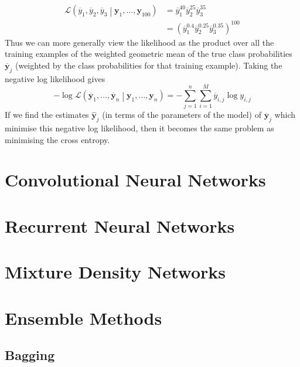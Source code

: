 \documentclass[11pt]{report} %
\begin{document}
\begin{align}
\mathcal{L}\left(\overline{y}_{1}, \overline{y}_{2}, \overline{y}_{3}\middle|\mathbf{y}_{1}, \dots, \mathbf{y}_{100}\right) &= \overline{y}_{1}^{40}\overline{y}_{2}^{25}\overline{y}_{3}^{35} \\
&= \left(\overline{y}_{1}^{0.4}\overline{y}_{2}^{0.25}\overline{y}_{3}^{0.35}\right)^{100}
\end{align}
Thus we can more generally view the likelihood as the product over all the training examples of the weighted geometric mean of the true class probabilities $\overline{\mathbf{y}}_{j}$ (weighted by the class probabilities for that training example). Taking the negative log likelihood gives
\begin{equation}
-\log\mathcal{L}\left(\overline{\mathbf{y}}_{1}, \dots, \overline{\mathbf{y}}_{n}\middle|\mathbf{y}_{1}, \dots, \mathbf{y}_{n}\right) = -\sum_{j = 1}^{n}\sum_{i = 1}^{M}\overline{y}_{i, j}\log{y_{i, j}}
\end{equation}
If we find the estimates $\hat{\mathbf{y}}_{j}$ (in terms of the parameters of the model) of $\overline{\mathbf{y}}_{j}$ which minimise this negative log likelihood, then it becomes the same problem as minimising the cross entropy.

\section{Convolutional Neural Networks}

\section{Recurrent Neural Networks}

\section{Mixture Density Networks}

\section{Ensemble Methods}

\subsection{Bagging}
\end{document}
